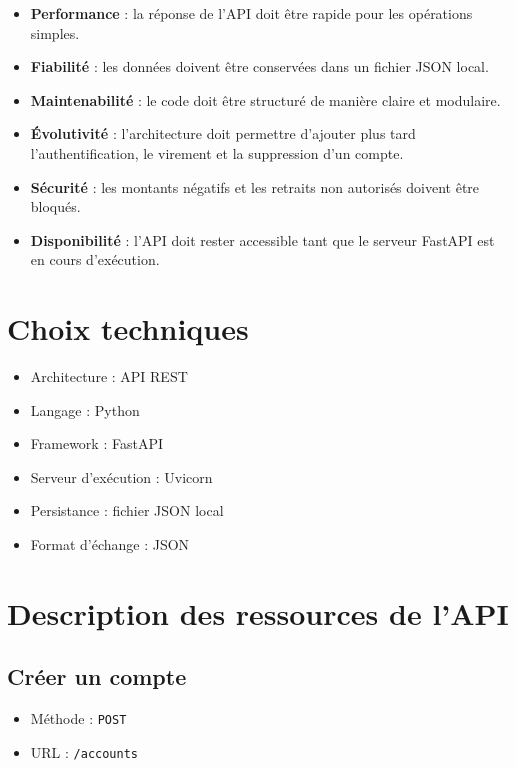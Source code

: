 \documentclass[12pt,a4paper]{article}
\begin{document}
\begin{itemize}
    \item \textbf{Performance} : la réponse de l'API doit être rapide pour les opérations simples.
    \item \textbf{Fiabilité} : les données doivent être conservées dans un fichier JSON local.
    \item \textbf{Maintenabilité} : le code doit être structuré de manière claire et modulaire.
    \item \textbf{Évolutivité} : l'architecture doit permettre d'ajouter plus tard l'authentification, le virement et la suppression d'un compte.
    \item \textbf{Sécurité} : les montants négatifs et les retraits non autorisés doivent être bloqués.
    \item \textbf{Disponibilité} : l'API doit rester accessible tant que le serveur FastAPI est en cours d'exécution.
\end{itemize}

\section{Choix techniques}

\begin{itemize}
    \item Architecture : API REST
    \item Langage : Python
    \item Framework : FastAPI
    \item Serveur d'exécution : Uvicorn
    \item Persistance : fichier JSON local
    \item Format d'échange : JSON
\end{itemize}

\section{Description des ressources de l'API}

\subsection{Créer un compte}

\begin{itemize}
    \item Méthode : \texttt{POST}
    \item URL : \texttt{/accounts}
\end{itemize}
\end{document}

